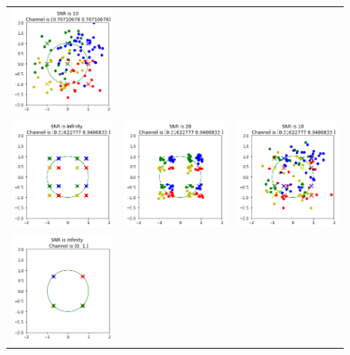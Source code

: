 \begin{figure}
\begin{tabular}{ccc}
    \includegraphics[width=45mm]{figures/equal_intro/snr_10_c2/cfo_0.png}\\
    \includegraphics[width=45mm]{figures/equal_intro/snr_0_c4/cfo_0.png}&
    \includegraphics[width=45mm]{figures/equal_intro/snr_20_c4/cfo_0.png}&
    \includegraphics[width=45mm]{figures/equal_intro/snr_10_c4/cfo_0.png}\\
    \includegraphics[width=45mm]{figures/equal_intro/snr_0_c5/cfo_0.png}&

\end{tabular}
\end{figure}
